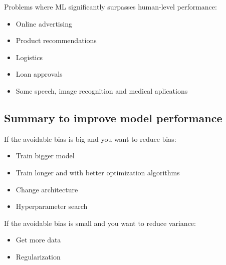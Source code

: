 Problems where ML significantly surpasses human-level performance:
\begin{itemize}
    \item Online advertising
    \item Product recommendations
    \item Logistics
    \item Loan approvals
    \item Some speech, image recognition and medical aplications    
\end{itemize}

\subsection{Summary to improve model performance}

If the avoidable bias is big and you want to reduce bias:
\begin{itemize}
    \item Train bigger model
    \item Train longer and with better optimization algorithms
    \item Change architecture 
    \item Hyperparameter search
\end{itemize}
If the avoidable bias is small and you want to reduce variance:
\begin{itemize}
    \item Get more data
    \item Regularization
\end{itemize}


